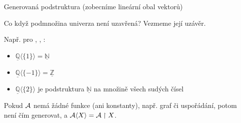 \documentclass{beamer}
\begin{document}
\begin{frame}{Generovaná podstruktura (zobecníme lineární obal vektorů)}
    
    \pause
    Co když podmnožina univerza \alert{není} uzavřená? Vezmeme její \alert{uzávěr}. %

    \medskip

    \pause

    \medskip

    \pause
    Např. pro , , : \pause
    \begin{itemize}
        \item $\underline{\mathbb Q}\langle\{1\}\rangle=\underline{\mathbb N}$\pause
        \item $\underline{\mathbb Q}\langle\{-1\}\rangle=\underline{\mathbb Z}$\pause
        \item $\underline{\mathbb Q}\langle\{2\}\rangle$ je podstruktura $\underline{\mathbb N}$ na množině všech sudých čísel
    \end{itemize}

    \medskip
    
    \pause
    Pokud $\mathcal{A}$ nemá žádné funkce (ani konstanty), např. graf či uspořádání, potom není čím generovat, a $\mathcal{A}\langle X\rangle=\mathcal{A}\restriction X$.
    
\end{frame}
\end{document}
